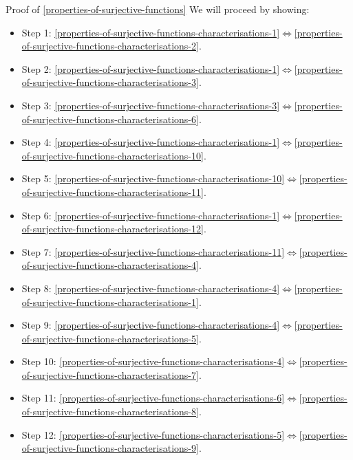 \begin{Proof}{Proof of \cref{properties-of-surjective-functions}}%
    We will proceed by showing:
    \begin{itemize}
        \item Step 1: \cref{properties-of-surjective-functions-characterisations-1}$\iff$\cref{properties-of-surjective-functions-characterisations-2}.
        \item Step 2: \cref{properties-of-surjective-functions-characterisations-1}$\iff$\cref{properties-of-surjective-functions-characterisations-3}.
        \item Step 3: \cref{properties-of-surjective-functions-characterisations-3}$\iff$\cref{properties-of-surjective-functions-characterisations-6}.
        \item Step 4: \cref{properties-of-surjective-functions-characterisations-1}$\iff$\cref{properties-of-surjective-functions-characterisations-10}.
        \item Step 5: \cref{properties-of-surjective-functions-characterisations-10}$\iff$\cref{properties-of-surjective-functions-characterisations-11}.
        \item Step 6: \cref{properties-of-surjective-functions-characterisations-1}$\iff$\cref{properties-of-surjective-functions-characterisations-12}.
        \item Step 7: \cref{properties-of-surjective-functions-characterisations-11}$\iff$\cref{properties-of-surjective-functions-characterisations-4}.
        \item Step 8: \cref{properties-of-surjective-functions-characterisations-4}$\iff$\cref{properties-of-surjective-functions-characterisations-1}.
        \item Step 9: \cref{properties-of-surjective-functions-characterisations-4}$\iff$\cref{properties-of-surjective-functions-characterisations-5}.
        \item Step 10: \cref{properties-of-surjective-functions-characterisations-4}$\iff$\cref{properties-of-surjective-functions-characterisations-7}.
        \item Step 11: \cref{properties-of-surjective-functions-characterisations-6}$\iff$\cref{properties-of-surjective-functions-characterisations-8}.
        \item Step 12: \cref{properties-of-surjective-functions-characterisations-5}$\iff$\cref{properties-of-surjective-functions-characterisations-9}.
    \end{itemize}


\end{Proof}
